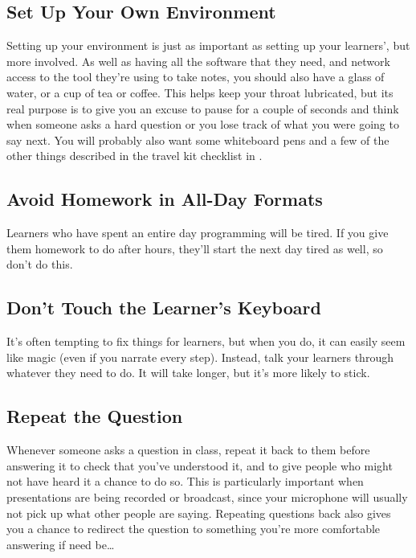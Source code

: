 \subsection*{Set Up Your Own Environment}

Setting up your environment is just as important as setting up your
learners', but more involved. As well as having all the software that
they need, and network access to the tool they're using to take notes,
you should also have a glass of water, or a cup of tea or coffee. This
helps keep your throat lubricated, but its real purpose is to give you
an excuse to pause for a couple of seconds and think when someone asks
a hard question or you lose track of what you were going to say next.
You will probably also want some whiteboard pens and a few of the
other things described in the travel kit checklist in
.

\subsection*{Avoid Homework in All-Day Formats}

Learners who have spent an entire day programming will be tired.  If
you give them homework to do after hours, they'll start the next day
tired as well, so don't do this.

\subsection*{Don't Touch the Learner's Keyboard}

It's often tempting to fix things for learners, but when you do, it
can easily seem like magic (even if you narrate every step). Instead,
talk your learners through whatever they need to do. It will take
longer, but it's more likely to stick.

\subsection*{Repeat the Question}

Whenever someone asks a question in class, repeat it back to them
before answering it to check that you've understood it, and to give
people who might not have heard it a chance to do so. This is
particularly important when presentations are being recorded or
broadcast, since your microphone will usually not pick up what other
people are saying.  Repeating questions back also gives you a chance
to redirect the question to something you're more comfortable
answering if need be{\ldots}

